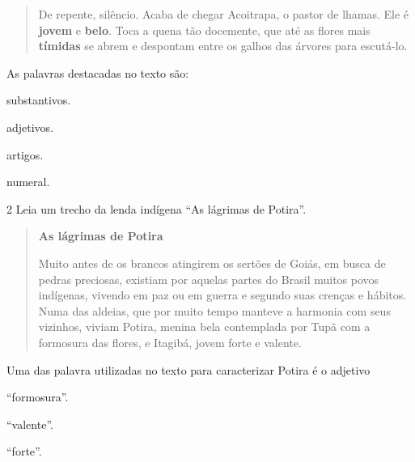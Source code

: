 \begin{conteudo}
\begin{conteudo}
\begin{conteudo}
\begin{conteudo}
\begin{quote}
De repente, silêncio. Acaba de chegar Acoitrapa, o
pastor de lhamas. Ele é \textbf{jovem} e \textbf{belo}. Toca a quena tão
docemente, que até as flores mais \textbf{tímidas} se abrem e
despontam entre os galhos das árvores para escutá-lo. 

\end{quote}

As palavras destacadas no texto são:

\begin{escolha}
\item substantivos.

\item adjetivos.

\item artigos.

\item numeral.
\end{escolha}

\num{2} Leia um trecho da lenda indígena ``As lágrimas de Potira''.

\begin{quote}
\textbf{As lágrimas de Potira}

Muito antes de os brancos atingirem os sertões de Goiás, em busca de
pedras preciosas, existiam por aquelas partes do Brasil muitos povos
indígenas, vivendo em paz ou em guerra e segundo suas crenças e hábitos.
Numa das aldeias, que por muito tempo manteve a harmonia com seus
vizinhos, viviam Potira, menina bela contemplada por Tupã com a formosura das
flores, e Itagibá, jovem forte e valente. 

\end{quote}

Uma das palavra utilizadas no texto para caracterizar Potira é o adjetivo

\begin{multicols}{2}
\begin{escolha}
\item ``formosura''.

\item ``valente''.

\item ``forte''.


\end{escolha}
\end{multicols}
\end{conteudo}
\end{conteudo}
\end{conteudo}
\end{conteudo}

